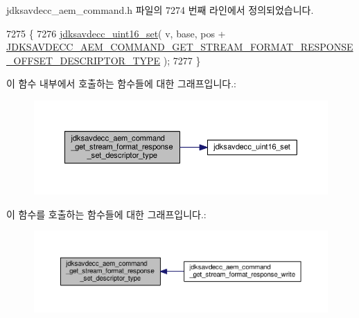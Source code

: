 jdksavdecc\+\_\+aem\+\_\+command.\+h 파일의 7274 번째 라인에서 정의되었습니다.


\begin{DoxyCode}
7275 \{
7276     \hyperlink{group__endian_ga14b9eeadc05f94334096c127c955a60b}{jdksavdecc\_uint16\_set}( v, base, pos + 
      \hyperlink{group__command__get__stream__format__response_ga6dc8fa7cca8f786844c40aba37d49d1d}{JDKSAVDECC\_AEM\_COMMAND\_GET\_STREAM\_FORMAT\_RESPONSE\_OFFSET\_DESCRIPTOR\_TYPE}
       );
7277 \}
\end{DoxyCode}


이 함수 내부에서 호출하는 함수들에 대한 그래프입니다.\+:
\nopagebreak
\begin{figure}[H]
\begin{center}
\leavevmode
\includegraphics[width=350pt]{group__command__get__stream__format__response_ga3d2bedcefa545b4183f8c3547e18d697_cgraph}
\end{center}
\end{figure}




이 함수를 호출하는 함수들에 대한 그래프입니다.\+:
\nopagebreak
\begin{figure}[H]
\begin{center}
\leavevmode
\includegraphics[width=350pt]{group__command__get__stream__format__response_ga3d2bedcefa545b4183f8c3547e18d697_icgraph}
\end{center}
\end{figure}


